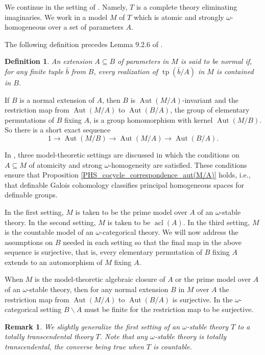\documentclass{article}
\theoremstyle{problemstyle}
\newtheorem{definition}[problem]{Definition}
\newtheorem{remark}[problem]{Remark}
\DeclareMathOperator{\tp}{tp} %
\DeclareMathOperator{\aut}{Aut} %
\DeclareMathOperator{\acl}{acl} %
\begin{document}
We continue in the setting of \cite{pillay_1997}. Namely, $T$ is a complete theory eliminating imaginaries. We work in a model $M$ of $T$ which is atomic and strongly $\omega$-homogeneous over a set of parameters $A$.

The following definition precedes Lemma 9.2.6 of \cite{tent_ziegler_2012}.

\begin{definition} 
An extension $A \subseteq B$ of parameters in $M$ is said to be normal if, for any finite tuple $\bar{b}$ from $B$, every realization of $\tp(\bar{b}/A)$ in $M$ is contained in $B$.
\end{definition}

If $B$ is a normal extension of $A$, then $B$ is $\aut(M/A)$-invariant and the restriction map from $\aut(M/A)$ to $\aut(B/A)$, the group of elementary permutations of $B$ fixing $A$, is a group homomorphism with kernel $\aut(M/B)$. So there is a short exact sequence 
$$1 \to \aut(M/B) \to \aut(M/A) \to \aut(B/A).$$

In \cite{pillay_1997}, three model-theoretic settings are discussed in which the conditions on $A \subseteq M$ of atomicity and strong $\omega$-homogeneity are satisfied. These conditions ensure that Proposition \ref{PHS_cocycle_correspondence_aut(M/A)} holds, i.e., that definable Galois cohomology classifies principal homogeneous spaces for definable groups. 

In the first setting, $M$ is taken to be the prime model over $A$ of an $\omega$-stable theory. In the second setting, $M$ is taken to be $\acl(A)$. In the third setting, $M$ is the countable model of an $\omega$-categorical theory. We will now address the assumptions on $B$ needed in each setting so that the final map in the above sequence is surjective, that is, every elementary permutation of $B$ fixing $A$ extends to an automorphism of $M$ fixing $A$.

When $M$ is the model-theoretic algebraic closure of $A$ or the prime model over $A$ of an $\omega$-stable theory, then for any normal extension $B$ in $M$ over $A$ the restriction map from $\aut(M/A)$ to $\aut(B/A)$ is surjective. In the $\omega$-categorical setting $B\backslash A$ must be finite for the restriction map to be surjective.

\begin{remark}
    We slightly generalize the first setting of an $\omega$-stable theory $T$ to a totally transcendental theory $T$. Note that any $\omega$-stable theory is totally transcendental, the converse being true when $T$ is countable.
\end{remark}
\end{document}

